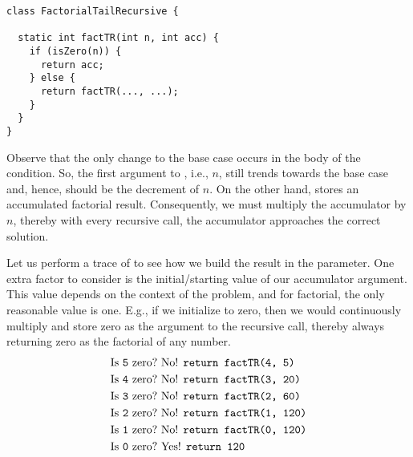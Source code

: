 \begin{lstlisting}[language=MyJava]
class FactorialTailRecursive {

  static int factTR(int n, int acc) {
    if (isZero(n)) {
      return acc;
    } else {
      return factTR(..., ...);
    }
  }
}
\end{lstlisting}

Observe that the only change to the base case occurs in the body of the condition. So, the first argument to , i.e., $n$, still trends towards the base case and, hence, should be the decrement of $n$. On the other hand,  stores an accumulated factorial result. Consequently, we must multiply the accumulator by $n$, thereby with every recursive call, the accumulator approaches the correct solution.

Let us perform a trace of  to see how we build the result in the  parameter. One extra factor to consider is the initial/starting value of our accumulator argument. This value depends on the context of the problem, and for factorial, the only reasonable value is one. E.g., if we initialize  to zero, then we would continuously multiply and store zero as the argument to the recursive call, thereby always returning zero as the factorial of any number.
\begin{align*}
    \text{Is }\texttt{5} \text{ zero?} &\text{ No! }\texttt{return factTR(4, 5)}\\
    \text{Is }\texttt{4} \text{ zero?} &\text{ No! }\texttt{return factTR(3, 20)}\\
    \text{Is }\texttt{3} \text{ zero?} &\text{ No! }\texttt{return factTR(2, 60)}\\
    \text{Is }\texttt{2} \text{ zero?} &\text{ No! }\texttt{return factTR(1, 120)}\\
    \text{Is }\texttt{1} \text{ zero?} &\text{ No! }\texttt{return factTR(0, 120)}\\
    \text{Is }\texttt{0} \text{ zero?} &\text{ Yes! }\texttt{return 120}
\end{align*}
